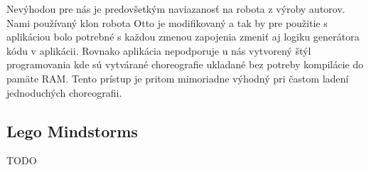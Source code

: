 Nevýhodou pre nás je predovšetkým naviazanosť na robota z výroby autorov. Nami používaný klon robota Otto je modifikovaný a tak by pre použitie s aplikáciou bolo potrebné s každou zmenou zapojenia zmeniť aj logiku generátora kódu v aplikácii. Rovnako aplikácia nepodporuje u nás vytvorený štýl programovania kde sú vytvárané choreografie ukladané bez potreby kompilácie do pamäte RAM. Tento prístup je pritom mimoriadne výhodný pri častom ladení jednoduchých choreografii. 

\subsection{Lego Mindstorms}
TODO
